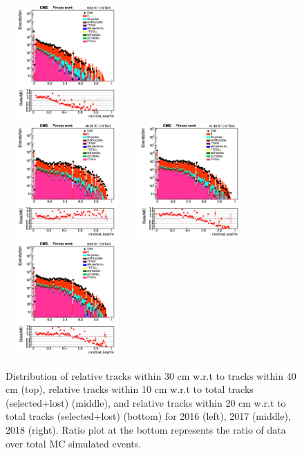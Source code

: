 \documentclass{cernatlasnote}
\begin{document}
\begin{figure}[htp]
 \includegraphics[width=4.6cm, height=4.4cm]{images/emu_channel/2018/18_Range_0pt2_1pt8/track_ntrk10reltot_TRK_Log.png}\\
\includegraphics[width=4.6cm, height=4.4cm]{images/emu_channel/2016/16_Range_0pt2_1pt8/track_ntrk20reltot_TRK_Log.png}
\includegraphics[width=4.6cm, height=4.4cm]{images/emu_channel/2017/17_Range_0pt2_1pt8/track_ntrk20reltot_TRK_Log.png}
 \includegraphics[width=4.6cm, height=4.4cm]{images/emu_channel/2018/18_Range_0pt2_1pt8/track_ntrk20reltot_TRK_Log.png}\\
  \caption{Distribution of relative tracks within 30 cm  w.r.t to tracks within 40 cm (top), relative tracks within 10 cm  w.r.t to total tracks (selected+lost) (middle), and relative tracks within 20 cm  w.r.t to total tracks (selected+lost) (bottom) for 2016 (left), 2017 (middle), 2018 (right). Ratio plot at the bottom represents the ratio of data over total MC simulated events.}
 \label{fig:L0DATAMC}
  \end{figure}
\end{document}
